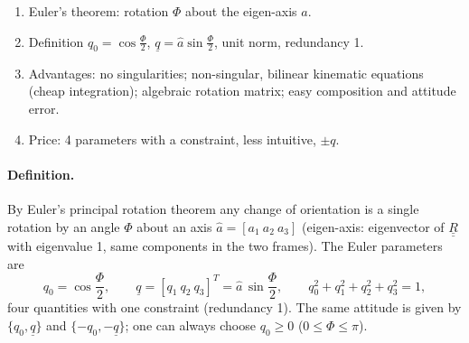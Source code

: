 \begin{outline}
\begin{enumerate}
\item Euler's theorem: rotation $\Phi$ about the eigen-axis $\hat a$.
\item Definition $q_0=\cos\frac\Phi2$, $\underline q=\hat a\sin\frac\Phi2$, unit norm, redundancy 1.
\item Advantages: no singularities; non-singular, bilinear kinematic equations (cheap integration); algebraic rotation matrix;
easy composition and attitude error.
\item Price: 4 parameters with a constraint, less intuitive, $\pm q$.
\end{enumerate}
\end{outline}

\answer
\paragraph{Definition.} By Euler's principal rotation theorem any change of orientation is a single rotation by an angle $\Phi$ about an
axis $\hat a=[a_1\ a_2\ a_3]$ (eigen-axis: eigenvector of $\underline{\underline R}$ with eigenvalue 1, same components in the two frames). The
Euler parameters are
\begin{equation}
q_0=\cos\frac\Phi2,\qquad \underline q=[q_1\ q_2\ q_3]^T=\hat a\,\sin\frac\Phi2,\qquad q_0^2+q_1^2+q_2^2+q_3^2=1,
\end{equation}
four quantities with one constraint (redundancy 1). The same attitude is given by $\{q_0,\underline q\}$ and $\{-q_0,-\underline q\}$; one can
always choose $q_0\ge0$ ($0\le\Phi\le\pi$).

